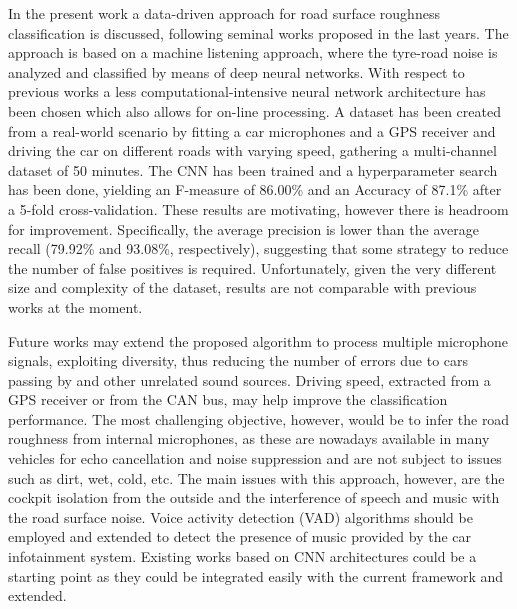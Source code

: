 In the present work a data-driven approach for road surface roughness classification is discussed, following seminal works proposed in the last years. The approach is based on a machine listening approach, where the tyre-road noise is analyzed and classified by means of deep neural networks. With respect to previous works a less computational-intensive neural network architecture has been chosen which also allows for on-line processing. A dataset has been created from a real-world scenario by fitting a car microphones and a GPS receiver and driving the car on different roads with varying speed, gathering a multi-channel dataset of 50 minutes. The CNN has been trained and a hyperparameter search has been done, yielding an F-measure of 86.00\% and an Accuracy of 87.1\% after a 5-fold cross-validation. These results are motivating, however there is headroom for improvement. Specifically, the average precision is lower than the average recall (79.92\% and 93.08\%, respectively), suggesting that some strategy to reduce the number of false positives is required. Unfortunately, given the very different size and complexity of the dataset, results are not comparable with previous works at the moment.

Future works may extend the proposed algorithm to process multiple microphone signals, exploiting diversity, thus reducing the number of errors due to cars passing by and other unrelated sound sources. Driving speed, extracted from a GPS receiver or from the CAN bus, may help improve the classification performance. The most challenging objective, however, would be to infer the road roughness from internal microphones, as these are nowadays available in many vehicles for echo cancellation and noise suppression and are not subject to issues such as dirt, wet, cold, etc. The main issues with this approach, however, are the cockpit isolation from the outside and the interference of speech and music with the road surface noise. Voice activity detection (VAD) \cite{Ephraim:1984,ghosh2011robust} algorithms should be employed and extended to detect the presence of music provided by the car infotainment system. Existing works based on CNN architectures \cite{wirn2016-vad,ijcnn2016-vad} could be a starting point as they could be integrated easily with the current framework and extended.


%


